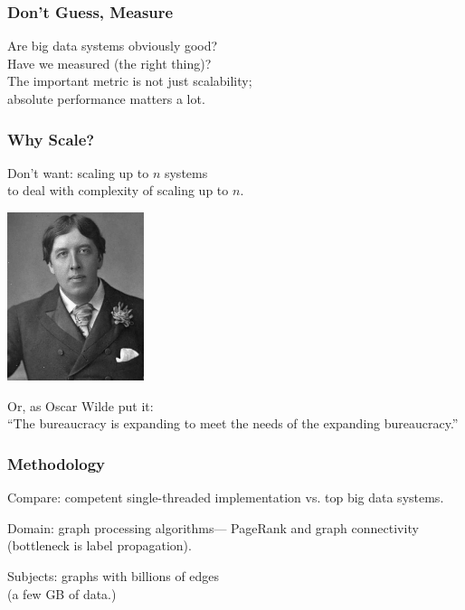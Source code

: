 \begin{frame}
\frametitle{Don't Guess, Measure}


\begin{changemargin}{1cm}
Are big data systems obviously good?\\
Have we measured (the right thing)?\\[1em]

The important metric is not just scalability; \\
absolute performance matters a lot. 

\end{changemargin}

\end{frame}



\begin{frame}
\frametitle{Why Scale?}


\begin{changemargin}{1cm}
Don't want: scaling up to $n$ systems \\
to deal with complexity of scaling up to $n$.\\[1em]

\begin{center}
	\includegraphics[width=0.3\textwidth]{images/wilde.jpg}
\end{center}

Or, as Oscar Wilde put it: \\
``The bureaucracy is expanding to meet the needs of the expanding bureaucracy.''
\end{changemargin}
\end{frame}



\begin{frame}
\frametitle{Methodology}


\begin{changemargin}{1cm}
Compare: competent single-threaded implementation vs. top
big data systems. 

Domain: graph processing
algorithms---
PageRank and graph connectivity \\
(bottleneck is label propagation). 

Subjects: graphs with billions of edges\\
(a few
GB of data.)
\end{changemargin}

\end{frame}



